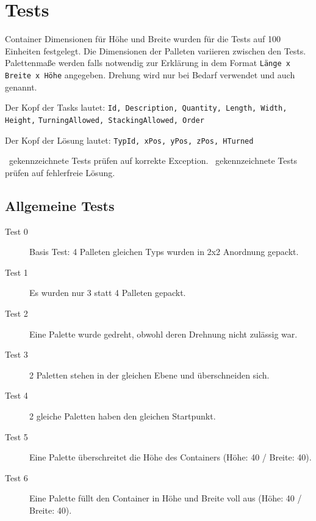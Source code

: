\documentclass{scrartcl}
\newcommand{\cmark}{\ding{51}}%
\newcommand{\xmark}{\ding{55}}%
\begin{document}
\section*{Tests}

Container Dimensionen für Höhe und Breite wurden für die Tests auf 100 Einheiten festgelegt. Die Dimensionen der Palleten variieren zwischen den Tests. Palettenmaße werden falls notwendig zur Erklärung in dem Format \verb|Länge x Breite x Höhe| angegeben. Drehung wird nur bei Bedarf verwendet und auch genannt.

\noindent Der Kopf der Tasks lautet: \verb|Id, Description, Quantity, Length, Width, Height,| \verb|TurningAllowed, StackingAllowed, Order|


\noindent Der Kopf der Lösung lautet: \verb|TypId, xPos, yPos, zPos, HTurned|

\xmark\ gekennzeichnete Tests prüfen auf korrekte Exception. \cmark\ gekennzeichnete Tests prüfen auf fehlerfreie Lösung.

\subsection*{Allgemeine Tests}

\begin{description}
	\item[Test 0 \cmark] Basis Test: 4 Palleten gleichen Typs wurden in 2x2 Anordnung gepackt.
	\item[Test 1 \xmark] Es wurden nur 3 statt 4 Palleten gepackt.
	\item[Test 2 \xmark] Eine Palette wurde gedreht, obwohl deren Drehnung nicht zulässig war.
	\item[Test 3 \xmark] 2 Paletten stehen in der gleichen Ebene und überschneiden sich.
	\item[Test 4 \xmark] 2 gleiche Paletten haben den gleichen Startpunkt.
	\item[Test 5 \xmark] Eine Palette überschreitet die Höhe des Containers (Höhe: 40 / Breite: 40).
	\item[Test 6 \cmark] Eine Palette füllt den Container in Höhe und Breite voll aus (Höhe: 40 / Breite: 40).
\end{description}
\end{document}
